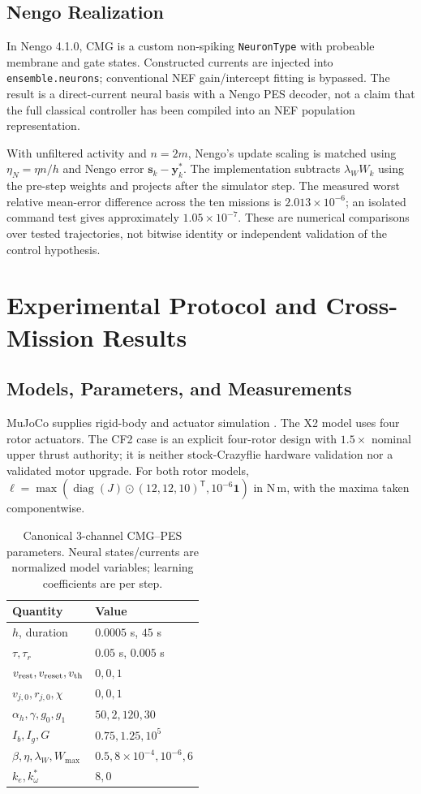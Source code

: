 \documentclass[letterpaper,10pt,conference]{IEEEtran}
\newcommand{\T}{^{\mathsf T}}
\begin{document}
\subsection{Nengo Realization}
In Nengo 4.1.0, CMG is a custom non-spiking \texttt{NeuronType} with
probeable membrane and gate states. Constructed currents are injected into
\texttt{ensemble.neurons}; conventional NEF gain/intercept fitting is
bypassed. The result is a direct-current neural basis with a Nengo PES
decoder, not a claim that the full classical controller has been compiled
into an NEF population representation.

With unfiltered activity and $n=2m$, Nengo's update scaling is matched using
$\eta_N=\eta n/h$ and Nengo error $\bm s_k-\bm y_k^*$.
The implementation subtracts $\lambda_WW_k$ using the pre-step weights
and projects after the simulator step. The measured worst relative
mean-error difference across the ten missions is $2.013\times10^{-6}$;
an isolated command test gives approximately $1.05\times10^{-7}$.
These are numerical comparisons over tested trajectories, not bitwise
identity or independent validation of the control hypothesis.

\section{Experimental Protocol and Cross-Mission Results}
\label{sec:results}
\subsection{Models, Parameters, and Measurements}
MuJoCo supplies rigid-body and actuator simulation \cite{todorov2012mujoco}.
The X2 model uses four rotor actuators. The CF2 case is an explicit
four-rotor design with $1.5\times$ nominal upper thrust authority; it is
neither stock-Crazyflie hardware validation nor a validated motor upgrade.
For both rotor models,
$\bm\ell=\max(\operatorname{diag}(J)\odot(12,12,10)\T,10^{-6}\bm1)$
in N\,m, with the maxima taken componentwise.



\begin{table}[t]
\caption{Canonical 3-channel CMG--PES parameters. Neural states/currents
are normalized model variables; learning coefficients are per step.}
\label{tab:parameters}\centering\small
\begin{tabular}{ll}
\toprule
Quantity & Value\\\midrule
$h$, duration & $0.0005$ s, $45$ s\\
$\tau,\tau_r$ & $0.05$ s, $0.005$ s\\
$v_{\rm rest},v_{\rm reset},v_{\rm th}$ & $0,0,1$\\
$v_{j,0},r_{j,0},\chi$ & $0,0,1$\\
$\alpha_h,\gamma,g_0,g_1$ & $50,2,120,30$\\
$I_b,I_g,G$ & $0.75,1.25,10^5$\\
$\beta,\eta,\lambda_W,W_{\max}$ & $0.5,8\times10^{-4},10^{-6},6$\\
$k_e,k_\omega^*$ & $8,0$\\
\bottomrule
\end{tabular}
\end{table}
\end{document}
